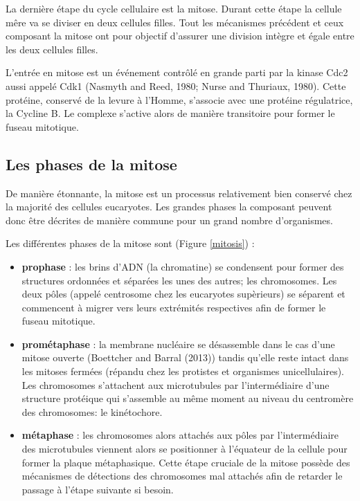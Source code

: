 \documentclass[12pt,a4paper,twoside,openright]{book}
\begin{document}
La dernière étape du cycle cellulaire est la mitose. Durant cette étape
la cellule mêre va se diviser en deux cellules filles. Tout les
mécanismes précédent et ceux composant la mitose ont pour objectif
d'assurer une division intègre et égale entre les deux cellules filles.

L'entrée en mitose est un événement contrôlé en grande parti par la
kinase Cdc2 aussi appelé Cdk1 (Nasmyth and Reed, 1980; Nurse and
Thuriaux, 1980). Cette protéine, conservé de la levure à l'Homme,
s'associe avec une protéine régulatrice, la Cycline B. Le complexe
s'active alors de manière transitoire pour former le fuseau mitotique.

\subsection{Les phases de la mitose}\label{les-phases-de-la-mitose}

De manière étonnante, la mitose est un processus relativement bien
conservé chez la majorité des cellules eucaryotes. Les grandes phases la
composant peuvent donc être décrites de manière commune pour un grand
nombre d'organismes.

Les différentes phases de la mitose sont (Figure \ref{mitosis}) :

\begin{itemize}
\item
  \textbf{prophase} : les brins d'ADN (la chromatine) se condensent pour
  former des structures ordonnées et séparées les unes des autres; les
  chromosomes. Les deux pôles (appelé centrosome chez les eucaryotes
  supèrieurs) se séparent et commencent à migrer vers leurs extrémités
  respectives afin de former le fuseau mitotique.
\item
  \textbf{prométaphase} : la membrane nucléaire se désassemble dans le
  cas d'une mitose ouverte (Boettcher and Barral (2013)) tandis qu'elle
  reste intact dans les mitoses fermées (répandu chez les protistes et
  organismes unicellulaires). Les chromosomes s'attachent aux
  microtubules par l'intermédiaire d'une structure protéique qui
  s'assemble au même moment au niveau du centromère des chromosomes: le
  kinétochore.
\item
  \textbf{métaphase} : les chromosomes alors attachés aux pôles par
  l'intermédiaire des microtubules viennent alors se positionner à
  l'équateur de la cellule pour former la plaque métaphasique. Cette
  étape cruciale de la mitose possède des mécanismes de détections des
  chromosomes mal attachés afin de retarder le passage à l'étape
  suivante si besoin.
\end{itemize}
\end{document}
